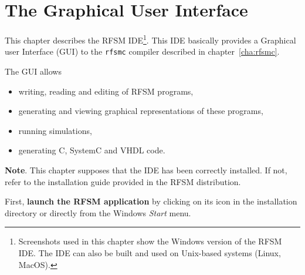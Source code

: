 \chapter*{The Graphical User Interface}
\label{cha:gui}

This chapter describes the RFSM IDE\footnote{Screenshots used in this chapter show the Windows
  version of the RFSM IDE. The IDE can also be built and used on Unix-based systems (Linux,
  MacOS).}. This IDE basically provides a Graphical user Interface (GUI) to the \verb|rfsmc|
compiler described in chapter~\ref{cha:rfsmc}.

\medskip
The GUI allows
\begin{itemize}
\item writing, reading and editing of RFSM programs,
\item generating and viewing graphical representations of these programs,
\item running simulations,
\item generating C, SystemC and VHDL code.
\end{itemize}

\medskip
\textbf{Note}. This chapter supposes that the IDE has been correctly installed. If not, refer to the
installation guide provided in the RFSM distribution.


\medskip
First, \textbf{launch the RFSM application} by clicking on its icon in the installation directory or
directly from the Windows \emph{Start} menu. 



